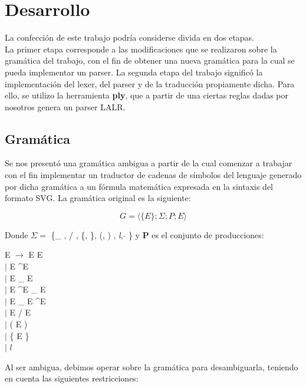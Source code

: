 \section{Desarrollo}

\indent \indent La confección de este trabajo podría considerse divida en dos etapas. \\
\indent La primer etapa corresponde a las modificaciones que se realizaron sobre la gramática del trabajo, con el fin de obtener una nueva gramática para la cual se pueda implementar un parser.
\indent La segunda etapa del trabajo significó la implementación del lexer, del parser y de la traducción propiamente dicha. Para ello, se utilizo la herramienta \textbf{ply}, que a partir de una ciertas reglas dadas por nosotros genera un parser LALR.\\

\subsection{Gramática}

\indent Se nos presentó una gramática ambigua a partir de la cual comenzar a trabajar con el fin implementar un traductor de cadenas de símbolos del lenguaje generado por dicha gramática a un fórmula matemática expresada en la sintaxis del formato SVG.
\indent La gramática original es la siguiente:

 \begin{equation}
    G = \langle \{ E\};\Sigma;P;E \rangle
 \end{equation}

\indent Donde $\Sigma = $ \{\_ , / , \{, \}, (, ) , \textit{l}, $\hat{}$ \}  y \textbf{P} es el conjunto de producciones:

\begin{center}
 E $\rightarrow$ E E 
\\  $|$ E \textasciicircum E
\\  $|$ E \_ E
\\  $|$ E \textasciicircum E \_ E
\\  $|$ E \_ E \textasciicircum E
\\  $|$ E / E
\\  $|$ ( E )
\\  $|$ \{ E \} 
\\  $|$ $l$
\end{center}

\indent Al ser ambigua, debimos operar sobre la gramática para desambiguarla, teniendo en cuenta las siguientes restricciones:

